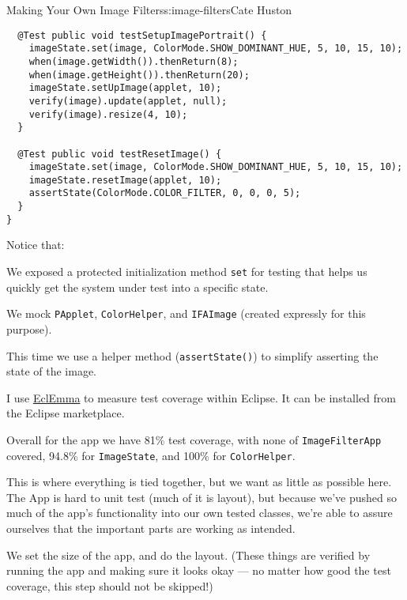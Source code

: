\begin{aosachapter}{Making Your Own Image Filters}{s:image-filters}{Cate Huston}
\begin{verbatim}
  @Test public void testSetupImagePortrait() {
    imageState.set(image, ColorMode.SHOW_DOMINANT_HUE, 5, 10, 15, 10);
    when(image.getWidth()).thenReturn(8);
    when(image.getHeight()).thenReturn(20);
    imageState.setUpImage(applet, 10);
    verify(image).update(applet, null);
    verify(image).resize(4, 10);
  }

  @Test public void testResetImage() {
    imageState.set(image, ColorMode.SHOW_DOMINANT_HUE, 5, 10, 15, 10);
    imageState.resetImage(applet, 10);
    assertState(ColorMode.COLOR_FILTER, 0, 0, 0, 5);
  }
}
\end{verbatim}

Notice that:

\begin{aosaitemize}

\item
  We exposed a protected initialization method \texttt{set} for testing
  that helps us quickly get the system under test into a specific state.
\item
  We mock \texttt{PApplet}, \texttt{ColorHelper}, and \texttt{IFAImage}
  (created expressly for this purpose).
\item
  This time we use a helper method (\texttt{assertState()}) to simplify
  asserting the state of the image.
\end{aosaitemize}

\label{measuring-test-coverage}

I use
\href{http://www.eclemma.org/installation.html\#marketplace}{EclEmma} to
measure test coverage within Eclipse. It can be installed from the
Eclipse marketplace.

Overall for the app we have 81\% test coverage, with none of
\texttt{ImageFilterApp} covered, 94.8\% for \texttt{ImageState}, and
100\% for \texttt{ColorHelper}.

\label{imagefilterapp}

This is where everything is tied together, but we want as little as
possible here. The App is hard to unit test (much of it is layout), but
because we've pushed so much of the app's functionality into our own
tested classes, we're able to assure ourselves that the important parts
are working as intended.

We set the size of the app, and do the layout. (These things are
verified by running the app and making sure it looks okay --- no matter
how good the test coverage, this step should not be skipped!)


\end{aosachapter}

